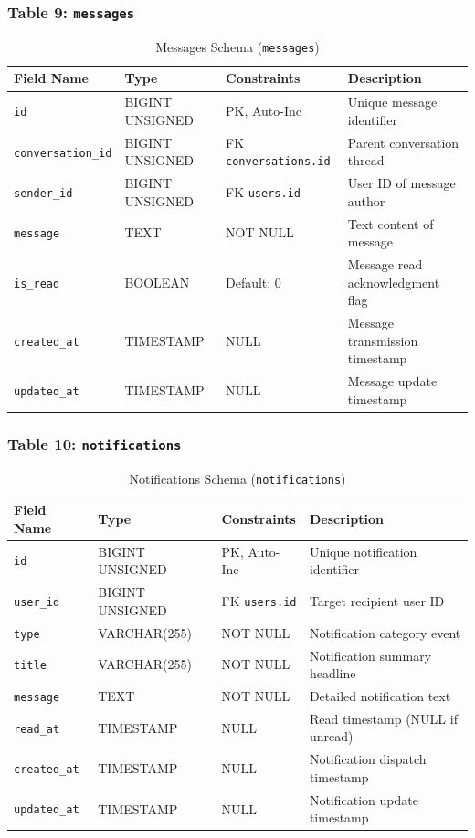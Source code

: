 \subsubsection{Table 9: \texttt{messages}}
\begin{table}[H]
\centering
\small
\caption{Messages Schema (\texttt{messages})}
\label{tab:schema_messages}
\begin{tabular}{|p{3cm}|p{2.8cm}|p{2.2cm}|p{5.5cm}|}
\hline
\textbf{Field Name} & \textbf{Type} & \textbf{Constraints} & \textbf{Description} \\ \hline
\texttt{id} & BIGINT UNSIGNED & PK, Auto-Inc & Unique message identifier \\ \hline
\texttt{conversation\_id}& BIGINT UNSIGNED & FK \texttt{conversations.id}& Parent conversation thread \\ \hline
\texttt{sender\_id} & BIGINT UNSIGNED & FK \texttt{users.id} & User ID of message author \\ \hline
\texttt{message} & TEXT & NOT NULL & Text content of message \\ \hline
\texttt{is\_read} & BOOLEAN & Default: 0 & Message read acknowledgment flag \\ \hline
\texttt{created\_at} & TIMESTAMP & NULL & Message transmission timestamp \\ \hline
\texttt{updated\_at} & TIMESTAMP & NULL & Message update timestamp \\ \hline
\end{tabular}
\end{table}

\subsubsection{Table 10: \texttt{notifications}}
\begin{table}[H]
\centering
\small
\caption{Notifications Schema (\texttt{notifications})}
\label{tab:schema_notifications}
\begin{tabular}{|p{3cm}|p{2.8cm}|p{2.2cm}|p{5.5cm}|}
\hline
\textbf{Field Name} & \textbf{Type} & \textbf{Constraints} & \textbf{Description} \\ \hline
\texttt{id} & BIGINT UNSIGNED & PK, Auto-Inc & Unique notification identifier \\ \hline
\texttt{user\_id} & BIGINT UNSIGNED & FK \texttt{users.id} & Target recipient user ID \\ \hline
\texttt{type} & VARCHAR(255) & NOT NULL & Notification category event \\ \hline
\texttt{title} & VARCHAR(255) & NOT NULL & Notification summary headline \\ \hline
\texttt{message} & TEXT & NOT NULL & Detailed notification text \\ \hline
\texttt{read\_at} & TIMESTAMP & NULL & Read timestamp (NULL if unread) \\ \hline
\texttt{created\_at} & TIMESTAMP & NULL & Notification dispatch timestamp \\ \hline
\texttt{updated\_at} & TIMESTAMP & NULL & Notification update timestamp \\ \hline
\end{tabular}
\end{table}

